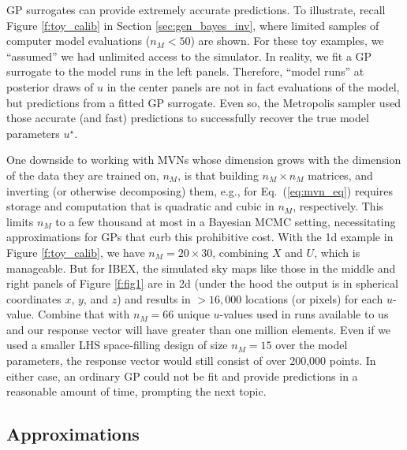\documentclass[11pt]{article}
\begin{document}
GP surrogates {\color{red}can provide extremely accurate predictions}. To
illustrate, recall Figure \ref{f:toy_calib} in
Section \ref{sec:gen_bayes_inv}, where limited samples of computer model
evaluations {\color{red}($n_M < 50$)} are shown. For these toy examples, we
``assumed'' we had unlimited access to the simulator. In reality, we fit a GP
surrogate to the model runs in the left panels. Therefore, ``model runs'' at
posterior draws of $u$ in the center panels are not in fact evaluations of the
model, but predictions from a fitted GP surrogate. Even so, the Metropolis
sampler used those accurate (and fast) predictions to successfully recover the
true model parameters $u^\star$.

One downside to working with MVNs whose dimension grows with the dimension of
the data they are trained on, $n_M$, is that building $n_M \times n_M$
matrices, and inverting (or otherwise decomposing) them, e.g., for
Eq.~(\ref{eq:mvn_eq}) requires storage and computation that is quadratic and
cubic in $n_M$, respectively.  This limits $n_M$ to a few thousand at most in a
Bayesian MCMC setting, necessitating approximations for GPs that curb this
prohibitive cost. With the 1d example in Figure \ref{f:toy_calib}, we have
$n_M=20 \times 30$, combining $X$ and $U$, which is manageable. But for IBEX,
the simulated sky maps like those in the middle and right panels of Figure
\ref{f:fig1} are in 2d (under the hood the output is in spherical coordinates
$x$, $y$, and $z$) and results in ${>}16{,}000$ locations (or pixels) for each
$u$-value. Combine that with {\color{red}$n_M=66$} unique $u$-values used in runs available to
us and our response vector will have greater than one million elements. Even if
we used a smaller LHS space-filling design of size {\color{red}$n_M=15$} over the model
parameters, the response vector would still consist of over 200,000 points. In
either case, an ordinary GP could not be fit and provide predictions in a
reasonable amount of time, prompting the next topic.

\subsection{Approximations}
\label{sec:gp_approx}
\end{document}
